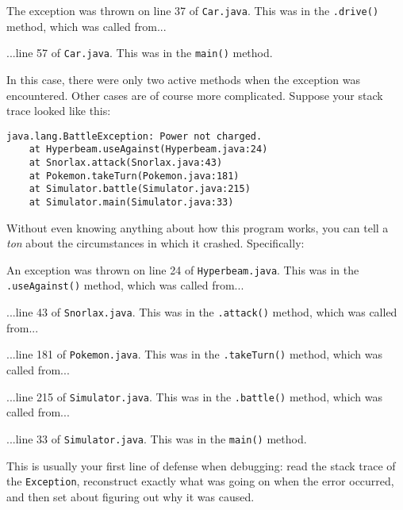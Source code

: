\begin{compactenum}
\item The exception was thrown on line 37 of \texttt{Car.java}. This was in
the \texttt{.drive()} method, which was called from...
\item ...line 57 of \texttt{Car.java}. This was in the \texttt{main()} method.
\end{compactenum}

In this case, there were only two active methods when the exception was
encountered. Other cases are of course more complicated. Suppose your stack
trace looked like this:

\begin{Verbatim}[fontsize=\small,samepage=true,frame=none]
java.lang.BattleException: Power not charged.
    at Hyperbeam.useAgainst(Hyperbeam.java:24)
    at Snorlax.attack(Snorlax.java:43)
    at Pokemon.takeTurn(Pokemon.java:181)
    at Simulator.battle(Simulator.java:215)
    at Simulator.main(Simulator.java:33)
\end{Verbatim}

Without even knowing anything about how this program works, you can tell a
\textit{ton} about the circumstances in which it crashed. Specifically:

\begin{compactenum}

\item An exception was thrown on line 24 of \texttt{Hyperbeam.java}. This was
in the \texttt{.useAgainst()} method, which was called from...

\item ...line 43 of \texttt{Snorlax.java}. This was in the \texttt{.attack()}
method, which was called from...

\item ...line 181 of \texttt{Pokemon.java}. This was in the
\texttt{.takeTurn()} method, which was called from...

\item ...line 215 of \texttt{Simulator.java}. This was in the
\texttt{.battle()} method, which was called from...

\item ...line 33 of \texttt{Simulator.java}. This was in the \texttt{main()}
method.

\end{compactenum}

This is usually your first line of defense when debugging: read the stack
trace of the \texttt{Exception}, reconstruct exactly what was going on when
the error occurred, and then set about figuring out why it was caused.

